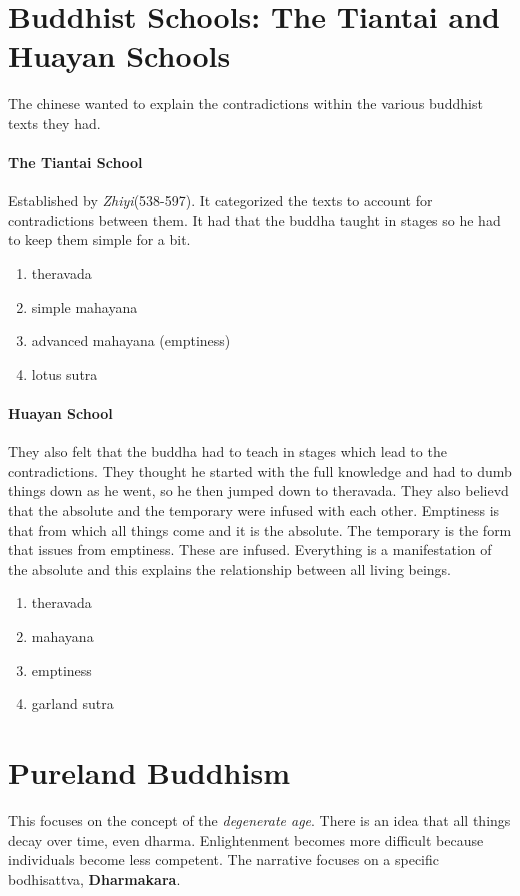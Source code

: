 \documentclass{article}
\begin{document}
\section*{Buddhist Schools: The Tiantai and Huayan Schools}
\label{sec:buddhist_schools_the_tiantai_and_huayan_schools}
The chinese wanted to explain the contradictions within the various buddhist texts they had.

\paragraph{The Tiantai School}
\label{par:the_tiantai_school}
Established by \emph{Zhiyi}(538-597). It categorized the texts to account for contradictions between them. It had that the buddha taught in stages so he had to keep them simple for a bit.
\begin{enumerate}
	\item theravada
	\item simple mahayana
	\item advanced mahayana (emptiness)
	\item lotus sutra
\end{enumerate}

\paragraph{Huayan School}
\label{par:huayan_school}
They also felt that the buddha had to teach in stages which lead to the contradictions. They thought he started with the full knowledge and had to dumb things down as he went, so he then jumped down to theravada. They also believd that the absolute and the temporary were infused with each other. Emptiness is that from which all things come and it is the absolute. The temporary is the form that issues from emptiness. These are infused. Everything is a manifestation of the absolute and this explains the relationship between all living beings.
\begin{enumerate}
	\item theravada
	\item mahayana
	\item emptiness
	\item garland sutra
\end{enumerate}

\section*{Pureland Buddhism}
\label{sec:pureland_buddhism}
This focuses on the concept of the \emph{degenerate age}. There is an idea that all things decay over time, even dharma. Enlightenment becomes more difficult because individuals become less competent. The narrative focuses on a specific bodhisattva, \textbf{Dharmakara}.
\end{document}
